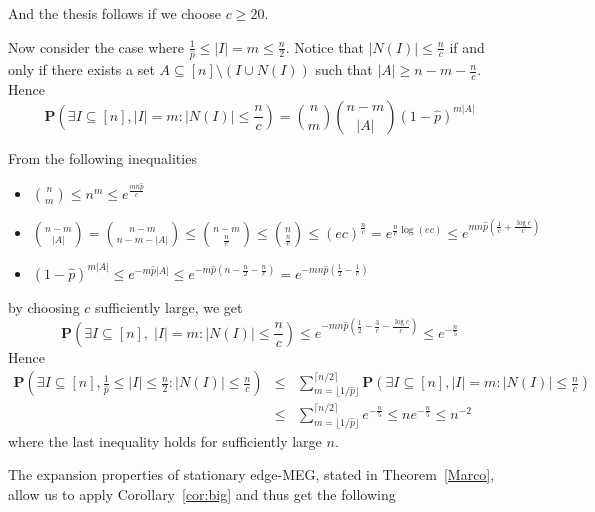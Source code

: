 \documentclass[10pt,a4paper]{article}
\newcommand{\Prob}[1]{\mathbf{P} \left( #1 \right)}
\newcommand{\qed}{\hspace{\stretch{1}$\square$}}
\begin{document}
\noindent And the thesis follows if we choose $c \geqslant 20$.

\smallskip
\noindent Now consider the case where  $\frac{1}{\hat{p}}\leqslant |I|=m\leqslant \frac{n}{2}$. Notice that $|N(I)|\leqslant \frac{n}{c}$ if and only if there exists a set $A\subseteq [n]\setminus (I\cup N(I))$ such that $|A|\geqslant n-m-\frac{n}{c}$. Hence
$$
\Prob{\exists I \subseteq [n],  |I|=m: |N(I)| \leqslant \frac{n}{c}  } = \binom{n}{m}
\binom{n-m}{|A|}(1-\hat{p})^{m|A|}
$$

\noindent From the following inequalities
\begin{itemize}

\item $\binom{n}{m} \leqslant n^m \leqslant e^{\frac{mn\hat{p}}{c}} $

\item $\binom{n-m}{|A|} = \binom{n-m}{n-m-|A|} \leqslant \binom{n-m}{\frac{n}{c}}\leqslant
\binom{n}{\frac{n}{c}}\leqslant (ec)^{\frac{n}{c}}= e^{\frac{n}{c}\log (ec)}\leqslant
e^{mn\hat{p}\left(\frac{1}{c}+\frac{\log c}{c}\right)}$

\item $(1-\hat{p})^{m|A|}\leqslant e^{-m\hat{p}|A|}\leqslant e^{-m\hat{p}\left(n-\frac{n}{2}-\frac{n}{c}\right)}=e^{-mn\hat{p}\left(\frac{1}{2}-\frac{1}{c}\right)}$
\end{itemize}
by choosing $c$ sufficiently large, we get
$$
\Prob{\exists I \subseteq [n], \; |I|=m: |N(I)| \leqslant \frac{n}{c}  } \leqslant
e^{-mn\hat{p}\left(\frac{1}{2}-\frac{3}{c}-\frac{\log c}{c}\right)}
\leqslant
e^{-\frac{n}{5}}
$$
Hence
\begin{eqnarray*}
\Prob{\exists I \subseteq [n],  \frac{1}{\hat{p}} \leqslant |I|  \leqslant \frac{n}{2} : |N(I)|
\leqslant \frac{n}{c} }
& \leqslant & \sum_{m=\lfloor 1/\hat{p} \rfloor}^{\lceil n/2 \rceil} \Prob{\exists I \subseteq [n], |I|=m: |N(I)| \leqslant \frac{n}{c}} \\
& \leqslant & \sum_{m=\lfloor 1/\hat{p} \rfloor}^{\lceil n/2 \rceil}  e^{-\frac{n}{5} } \leqslant ne^{-\frac{n}{5} } \leqslant n^{-2}
\end{eqnarray*}
where the last inequality holds for sufficiently large $n$.
\qed



\noindent The expansion properties of stationary edge-MEG, stated in Theorem~\ref{Marco}, allow us to apply Corollary~\ref{cor:big} and thus get the following
\end{document}
